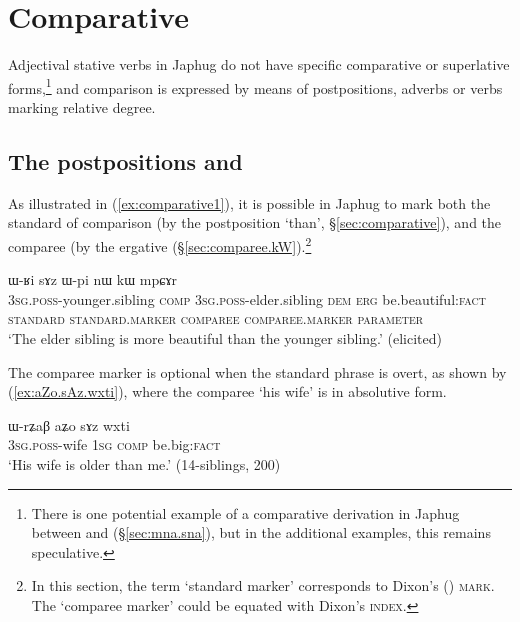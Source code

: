 \section{Comparative} \label{sec:comparison}

Adjectival stative verbs in Japhug do not have specific comparative or superlative forms,\footnote{There is  one potential example of a comparative derivation in Japhug between  and  (§\ref{sec:mna.sna}), but in the additional examples, this remains speculative. } and comparison is expressed by means of postpositions, adverbs or verbs marking relative degree.


\subsection{The postpositions  and } \label{sec:sAz.kW}
As illustrated in (\ref{ex:comparative1}), it is possible in Japhug to mark both the  standard of comparison (by the postposition  `than', §\ref{sec:comparative}), and the comparee (by  the ergative  (§\ref{sec:comparee.kW}).\footnote{In this section, the term `standard marker' corresponds to Dixon's (\citeyear{dixon08comparative}) \textsc{mark}. The `comparee marker' could be equated with Dixon's \textsc{index}. } 


\begin{exe}
\ex \label{ex:comparative1}
\glll  ɯ-ʁi sɤz ɯ-pi nɯ {                  } kɯ   mpɕɤr  \\
\textsc{3sg}.\textsc{poss}-younger.sibling \textsc{comp} \textsc{3sg}.\textsc{poss}-elder.sibling \textsc{dem} {   } \textsc{erg} be.beautiful:\textsc{fact} \\
\textsc{standard} \textsc{standard}.\textsc{marker} \textsc{comparee} { } {         } \textsc{comparee}.\textsc{marker} \textsc{parameter} \\
\glt `The elder sibling is more beautiful than the younger sibling.'  (elicited)
\end{exe}


The comparee marker is optional when the standard phrase is overt, as shown by (\ref{ex:aZo.sAz.wxti}), where the comparee  `his wife' is in absolutive form.

\begin{exe}
\ex \label{ex:aZo.sAz.wxti}
\gll ɯ-rʑaβ aʑo sɤz wxti \\
\textsc{3sg}.\textsc{poss}-wife \textsc{1sg} \textsc{comp} be.big:\textsc{fact} \\
\glt `His wife is older than me.' (14-siblings, 200)
\end{exe}

